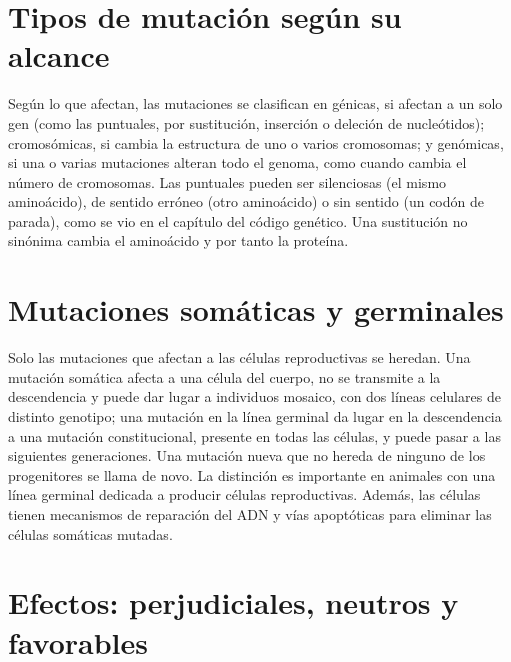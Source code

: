 \documentclass{book}
\begin{document}

\section{Tipos de mutación según su alcance}

Según lo que afectan, las mutaciones se clasifican en génicas, si afectan a un solo gen (como las puntuales, por sustitución, inserción o deleción de nucleótidos); cromosómicas, si cambia la estructura de uno o varios cromosomas; y genómicas, si una o varias mutaciones alteran todo el genoma, como cuando cambia el número de cromosomas. Las puntuales pueden ser silenciosas (el mismo aminoácido), de sentido erróneo (otro aminoácido) o sin sentido (un codón de parada), como se vio en el capítulo del código genético. Una sustitución no sinónima cambia el aminoácido y por tanto la proteína.


\section{Mutaciones somáticas y germinales}

Solo las mutaciones que afectan a las células reproductivas se heredan. Una mutación somática afecta a una célula del cuerpo, no se transmite a la descendencia y puede dar lugar a individuos mosaico, con dos líneas celulares de distinto genotipo; una mutación en la línea germinal da lugar en la descendencia a una mutación constitucional, presente en todas las células, y puede pasar a las siguientes generaciones. Una mutación nueva que no hereda de ninguno de los progenitores se llama de novo. La distinción es importante en animales con una línea germinal dedicada a producir células reproductivas. Además, las células tienen mecanismos de reparación del ADN y vías apoptóticas para eliminar las células somáticas mutadas.


\section{Efectos: perjudiciales, neutros y favorables}
\end{document}
